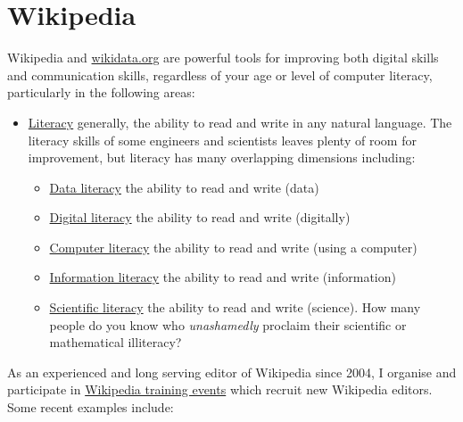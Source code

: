 \documentclass[
  12pt,
]{book}
\providecommand{\tightlist}{%
  \setlength{\itemsep}{0pt}\setlength{\parskip}{0pt}}
\begin{document}
\hypertarget{wikipedia}{%
\section{Wikipedia}\label{wikipedia}}

Wikipedia and \href{https://www.wikidata.org}{wikidata.org} \citep{Vrandecic2014, Turki2019} are powerful tools for improving both digital skills and communication skills, regardless of your age or level of computer literacy, \citep{Proffitt2018, goodfaith, Littlejohn2019} particularly in the following areas:

\begin{itemize}
\tightlist
\item
  \href{https://en.wikipedia.org/wiki/Literacy}{Literacy} generally, the ability to read and write in any natural language. The literacy skills of some engineers and scientists leaves plenty of room for improvement, but literacy has many overlapping dimensions including:

  \begin{itemize}
  \tightlist
  \item
    \href{https://en.wikipedia.org/wiki/Data_literacy}{Data literacy} the ability to read and write (data)
  \item
    \href{https://en.wikipedia.org/wiki/Digital_literacy}{Digital literacy} the ability to read and write (digitally)
  \item
    \href{https://en.wikipedia.org/wiki/Computer_literacy}{Computer literacy} the ability to read and write (using a computer)
  \item
    \href{https://en.wikipedia.org/wiki/Information_literacy}{Information literacy} the ability to read and write (information)
  \item
    \href{https://en.wikipedia.org/wiki/Scientific_literacy}{Scientific literacy} the ability to read and write (science). How many people do you know who \emph{unashamedly} proclaim their scientific or mathematical illiteracy? \citep{nevergoodatmaths, gowersproblem, mathillit}
  \end{itemize}
\end{itemize}

As an experienced and long serving editor of Wikipedia since 2004, I organise and participate in \href{https://en.wikipedia.org/wiki/Edit-a-thon}{Wikipedia training events} which recruit new Wikipedia editors. Some recent examples include:
\end{document}
